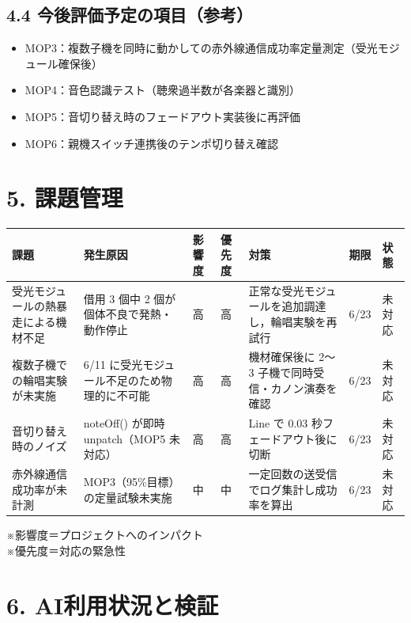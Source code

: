 \documentclass[a4paper,11pt]{ltjsarticle}
\providecommand{\％}{\%}
\begin{document}
\subsection*{4.4 今後評価予定の項目（参考）}

\begin{itemize}
    \item MOP3：複数子機を同時に動かしての赤外線通信成功率定量測定（受光モジュール確保後）
    \item MOP4：音色認識テスト（聴衆過半数が各楽器と識別）
    \item MOP5：音切り替え時のフェードアウト実装後に再評価
    \item MOP6：親機スイッチ連携後のテンポ切り替え確認
\end{itemize}

\section{5. 課題管理}

\begin{longtable}{|p{2.6cm}|p{2.8cm}|p{1cm}|p{1cm}|p{3.0cm}|p{1.6cm}|p{1.6cm}|}
\hline
\rowcolor[gray]{0.9}
課題 & 発生原因 & 影響度 & 優先度 & 対策 & 期限 & 状態 \\
\hline
受光モジュールの熱暴走による機材不足 & 借用 3 個中 2 個が個体不良で発熱・動作停止 & 高 & 高 & 正常な受光モジュールを追加調達し，輪唱実験を再試行 & 6/23 & 未対応 \\
\hline
複数子機での輪唱実験が未実施 & 6/11 に受光モジュール不足のため物理的に不可能 & 高 & 高 & 機材確保後に 2〜3 子機で同時受信・カノン演奏を確認 & 6/23 & 未対応 \\
\hline
音切り替え時のノイズ & noteOff() が即時 unpatch（MOP5 未対応） & 高 & 高 & Line で 0.03 秒フェードアウト後に切断 & 6/23 & 未対応 \\
\hline
赤外線通信成功率が未計測 & MOP3（95\％目標）の定量試験未実施 & 中 & 中 & 一定回数の送受信でログ集計し成功率を算出 & 6/23 & 未対応 \\
\hline
\end{longtable}

\vspace{0.5em}
※影響度＝プロジェクトへのインパクト\\
※優先度＝対応の緊急性

\section{6. AI利用状況と検証}
\end{document}
